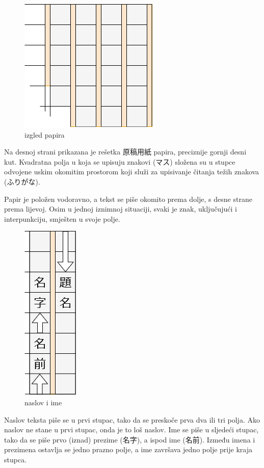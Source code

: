 
\author{Tomislav Mamić}


	
		
	\begin{figure}
		\centering
		\includegraphics[width=.25\textwidth]{017_pisanje_res/a1.png}
		\caption{izgled papira}
	\end{figure}

	Na desnoj strani prikazana je rešetka 原稿用紙 papira, preciznije gornji desni kut. Kvadratna polja u koja se upisuju znakovi (マス) složena su u stupce odvojene uskim okomitim prostorom koji služi za upisivanje čitanja težih znakova (ふりがな).
	
	Papir je položen vodoravno, a tekst se piše okomito prema dolje, s desne strane prema lijevoj. Osim u jednoj iznimnoj situaciji, svaki je znak, uključujući i interpunkciju, smješten u svoje polje.
	
	\begin{figure}
		\centering
		\includegraphics[width=.1\textwidth]{017_pisanje_res/a2.png}
		\caption{naslov i ime}
	\end{figure}
	

	Naslov teksta piše se u prvi stupac, tako da se preskoče prva dva ili tri polja. Ako naslov ne stane u prvi stupac, onda je to loš naslov. Ime se piše u sljedeći stupac, tako da se piše prvo (iznad) prezime (名字), a ispod ime (名前). Između imena i prezimena ostavlja se jedno prazno polje, a ime završava jedno polje prije kraja stupca.
		
